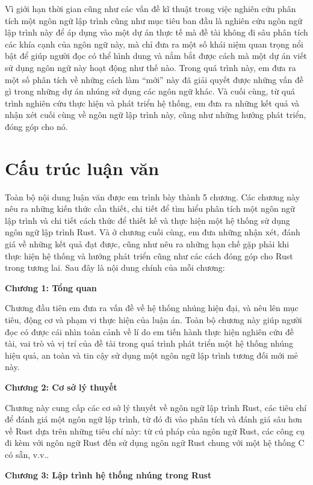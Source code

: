 Vì giới hạn thời gian cũng như các vấn đề kĩ thuật trong việc nghiên cứu phân tích một ngôn ngữ lập trình cũng như mục tiêu ban đầu là nghiên cứu ngôn ngữ lập trình này để áp dụng vào một dự án thực tế mà đề tài không đi sâu phân tích các khía cạnh của ngôn ngữ này, mà chỉ đưa ra một số khái niệm quan trọng nổi bật để giúp người đọc có thể hình dung và nắm bắt được cách mà một dự án viết sử dụng ngôn ngữ này hoạt động như thế nào.
Trong quá trình này, em đưa ra một số phân tích về những cách làm ``mới'' này đã giải quyết được những vấn đề gì trong những dự án nhúng sử dụng các ngôn ngữ khác.
Và cuối cùng, từ quá trình nghiên cứu thực hiện và phát triển hệ thống, em đưa ra những kết quả và nhận xét cuối cùng về ngôn ngữ lập trình này, cũng như những hướng phát triển, đóng góp cho nó.

\section{Cấu trúc luận văn}
Toàn bộ nội dung luận văn được em trình bày thành 5 chương. Các chương này nêu ra những kiến thức cần thiết, chi tiết để tìm hiểu phân tích một ngôn ngữ lập trình và chi tiết cách thức để thiết kế và thực hiện một hệ thống sử dụng ngôn ngữ lập trình Rust. Và ở chương cuối cùng, em đưa những nhận xét, đánh giá về những kết quả đạt được, cũng như nêu ra những hạn chế gặp phải khi thực hiện hệ thống và hướng phát triển cũng như các cách đóng góp cho Rust trong tương lai. Sau đây là nội dung chính của mỗi chương:

\textbf{Chương 1: Tổng quan}

Chương đầu tiên em đưa ra vấn đề về hệ thống nhúng hiện đại, và nêu lên mục tiêu, động cơ và phạm vi thực hiện của luận án. Toàn bộ chương này giúp người đọc có được cái nhìn toàn cảnh về lí do em tiến hành thực hiện nghiên cứu đề tài, vai trò và vị trí của đề tài trong quá trình phát triển một hệ thống nhúng hiệu quả, an toàn và tin cậy sử dụng một ngôn ngữ lập trình tương đối mới mẻ này.

\textbf{Chương 2: Cơ sở lý thuyết}

Chương này cung cấp các cơ sở lý thuyết về ngôn ngữ lập trình Rust, các tiêu chí để đánh giá một ngôn ngữ lập trình, từ đó đi vào phân tích và đánh giá sâu hơn về Rust dựa trên những tiêu chí này: từ cú pháp của ngôn ngữ Rust, các công cụ đi kèm với ngôn ngữ Rust đến sử dụng ngôn ngữ Rust chung với một hệ thống C có sẵn, v.v..

\textbf{Chương 3: Lập trình hệ thống nhúng trong Rust}

